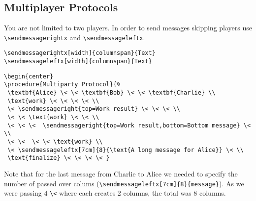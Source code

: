 \documentclass[a4paper]{report}
\begin{document}
\subsection{Multiplayer Protocols}

You are not limited to two players. In order to send messages skipping players use \lstinline$\sendmessagerightx$ and \lstinline$\sendmessageleftx$.
\begin{lstlisting}
\sendmessagerightx[width]{columnspan}{Text}
\sendmessageleftx[width]{columnspan}{Text}
\end{lstlisting}

\begin{center}
\end{center}

\begin{lstlisting}
\begin{center}
\procedure{Multiparty Protocol}{%
 \textbf{Alice} \< \< \textbf{Bob} \< \< \textbf{Charlie} \\
 \text{work} \< \< \< \< \\
 \< \sendmessageright{top=Work result} \< \< \< \\
 \< \< \text{work} \< \< \\
 \< \< \<  \sendmessageright{top=Work result,bottom=Bottom message} \< \\
 \< \<  \< \< \text{work} \\
 \< \sendmessageleftx[7cm]{8}{\text{A long message for Alice}} \< \\
 \text{finalize} \< \< \< \< }
\end{lstlisting}
Note that for the last message from Charlie to Alice we needed to specify the number of passed
over colums (\lstinline$\sendmessageleftx[7cm]{8}{message}$). As we were passing
4 \lstinline$\<$ where each creates 2 columns, the total was 8 columns.
\end{document}
